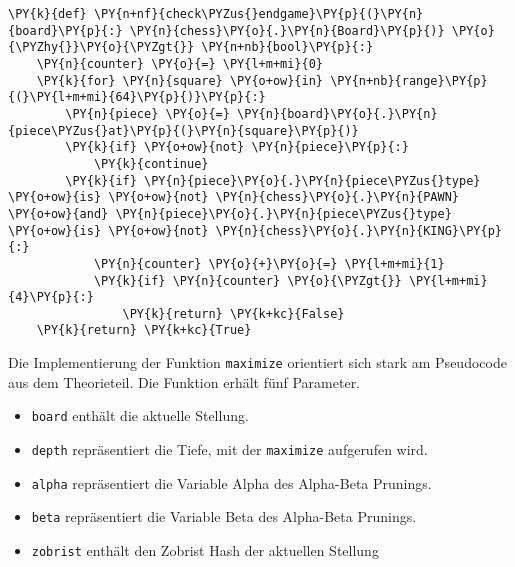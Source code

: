     \begin{tcolorbox}[fontupper=\linespread{.66}\selectfont, breakable, size=fbox, boxrule=1pt, pad at break*=1mm,colback=cellbackground, colframe=cellborder]
\begin{Verbatim}[commandchars=\\\{\}]
\PY{k}{def} \PY{n+nf}{check\PYZus{}endgame}\PY{p}{(}\PY{n}{board}\PY{p}{:} \PY{n}{chess}\PY{o}{.}\PY{n}{Board}\PY{p}{)} \PY{o}{\PYZhy{}}\PY{o}{\PYZgt{}} \PY{n+nb}{bool}\PY{p}{:}
    \PY{n}{counter} \PY{o}{=} \PY{l+m+mi}{0}
    \PY{k}{for} \PY{n}{square} \PY{o+ow}{in} \PY{n+nb}{range}\PY{p}{(}\PY{l+m+mi}{64}\PY{p}{)}\PY{p}{:}
        \PY{n}{piece} \PY{o}{=} \PY{n}{board}\PY{o}{.}\PY{n}{piece\PYZus{}at}\PY{p}{(}\PY{n}{square}\PY{p}{)}
        \PY{k}{if} \PY{o+ow}{not} \PY{n}{piece}\PY{p}{:}
            \PY{k}{continue}
        \PY{k}{if} \PY{n}{piece}\PY{o}{.}\PY{n}{piece\PYZus{}type} \PY{o+ow}{is} \PY{o+ow}{not} \PY{n}{chess}\PY{o}{.}\PY{n}{PAWN} \PY{o+ow}{and} \PY{n}{piece}\PY{o}{.}\PY{n}{piece\PYZus{}type} \PY{o+ow}{is} \PY{o+ow}{not} \PY{n}{chess}\PY{o}{.}\PY{n}{KING}\PY{p}{:}
            \PY{n}{counter} \PY{o}{+}\PY{o}{=} \PY{l+m+mi}{1}
            \PY{k}{if} \PY{n}{counter} \PY{o}{\PYZgt{}} \PY{l+m+mi}{4}\PY{p}{:}
                \PY{k}{return} \PY{k+kc}{False}
    \PY{k}{return} \PY{k+kc}{True}
\end{Verbatim}
\end{tcolorbox}

    Die Implementierung der Funktion \texttt{maximize} orientiert sich stark
am Pseudocode aus dem Theorieteil. Die Funktion erhält fünf Parameter.

\begin{itemize}
\tightlist
\item
  \texttt{board} enthält die aktuelle Stellung.
\item
  \texttt{depth} repräsentiert die Tiefe, mit der \texttt{maximize}
  aufgerufen wird.
\item
  \texttt{alpha} repräsentiert die Variable Alpha des Alpha-Beta
  Prunings.
\item
  \texttt{beta} repräsentiert die Variable Beta des Alpha-Beta Prunings.
\item
  \texttt{zobrist} enthält den Zobrist Hash der aktuellen Stellung
\end{itemize}

